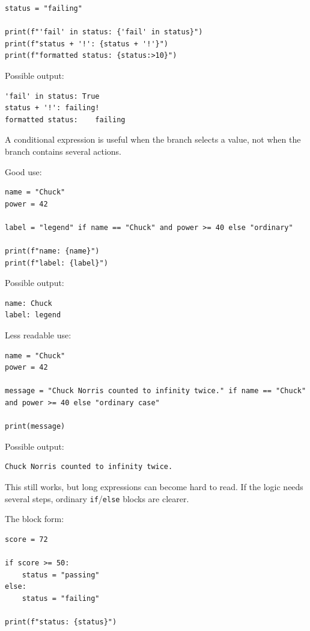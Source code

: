 \begin{verbatim}
status = "failing"

print(f"'fail' in status: {'fail' in status}")
print(f"status + '!': {status + '!'}")
print(f"formatted status: {status:>10}")
\end{verbatim}

Possible output:

\begin{verbatim}
'fail' in status: True
status + '!': failing!
formatted status:    failing
\end{verbatim}

A conditional expression is useful when the branch selects a value, not when the branch contains several actions.

Good use:

\begin{verbatim}
name = "Chuck"
power = 42

label = "legend" if name == "Chuck" and power >= 40 else "ordinary"

print(f"name: {name}")
print(f"label: {label}")
\end{verbatim}

Possible output:

\begin{verbatim}
name: Chuck
label: legend
\end{verbatim}

Less readable use:

\begin{verbatim}
name = "Chuck"
power = 42

message = "Chuck Norris counted to infinity twice." if name == "Chuck" and power >= 40 else "ordinary case"

print(message)
\end{verbatim}

Possible output:

\begin{verbatim}
Chuck Norris counted to infinity twice.
\end{verbatim}

This still works, but long expressions can become hard to read. If the logic needs several steps, ordinary \texttt{if}/\texttt{else} blocks are clearer.

The block form:

\begin{verbatim}
score = 72

if score >= 50:
    status = "passing"
else:
    status = "failing"

print(f"status: {status}")
\end{verbatim}

